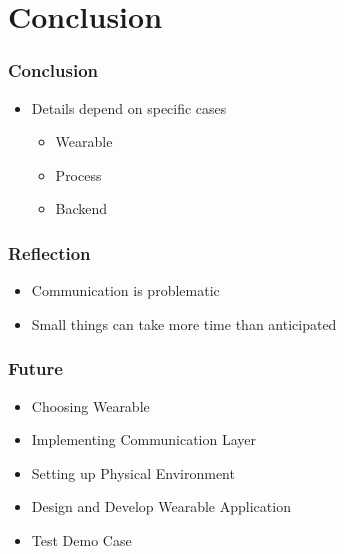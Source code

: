 \section{Conclusion}
\begin{frame}\frametitle{Conclusion}
	\begin{itemize}
		\item Details depend on specific cases
		\begin{itemize}
			\item Wearable
			\item Process
			\item Backend
		\end{itemize}
		
	\end{itemize}
\end{frame}
\begin{frame}\frametitle{Reflection}
	\begin{itemize}
		\item Communication is problematic
		\item Small things can take more time than anticipated
	\end{itemize}
\end{frame}
\begin{frame}\frametitle{Future}
	\begin{itemize}
		\item Choosing Wearable
		\item Implementing Communication Layer
		\item Setting up Physical Environment
		\item Design and Develop Wearable Application
		\item Test Demo Case
	\end{itemize}
\end{frame}